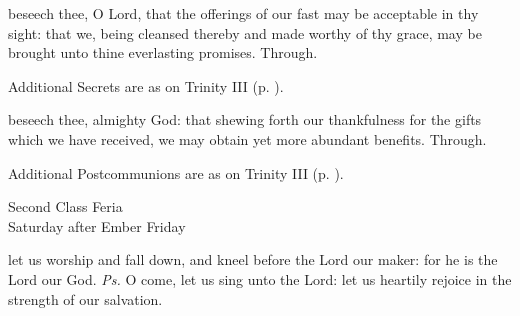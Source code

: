 \secret
{} beseech thee, O Lord, that the offerings of our fast may be acceptable in thy sight: that we, being cleansed thereby and made worthy of thy grace, may be brought unto thine everlasting promises. Through.
\begin{rubric}
    Additional Secrets are as on Trinity III (p. \pageref{TrinityIII}).
\end{rubric}

\postcommunion
{} beseech thee, almighty God: that shewing forth our thankfulness for the gifts which we have received, we may obtain yet more abundant benefits. Through.
\begin{rubric}
    Additional Postcommunions are as on Trinity III (p. \pageref{TrinityIII}).
\end{rubric}

\begin{inhead}
    {Second Class Feria\\
Saturday after Ember Friday}
\end{inhead}
\par\noindent
{}
\introit
{} let us worship and fall down, and kneel before the Lord our maker: for he is the Lord our God. \textit{Ps.} O come, let us sing unto the Lord: let us heartily rejoice in the strength of our salvation.

\clearpage

